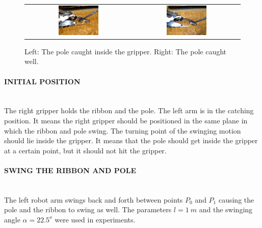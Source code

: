             \begin{figure}
                \centering
                \begin{tabular}{cc}
                \includegraphics[width=0.39\textwidth]{CaughtInsideAdj.png}
                &
                \includegraphics[width=0.39\textwidth]{CaughtWellAdj.png}
                \end{tabular}
                \caption{Left: The pole caught inside the gripper. Right: The pole caught well.}
                \label{fig:PoleCatching}
            \end{figure}

            \paragraph{INITIAL POSITION}~\\
                \noindent The right gripper holds the ribbon and the pole. The left arm is in the catching position. It means the right gripper should be positioned in the same plane in which the ribbon and pole swing. The turning point of the swinging motion should lie inside the gripper. It means that the pole should get inside the gripper at a certain point, but it should not hit the gripper.


            \paragraph{SWING THE RIBBON AND POLE}~\\
                \noindent The left robot arm swings back and forth between points $P_0$ and $P_1$ causing the pole and the ribbon to swing as well. The parameters $l = \SI{1}{m}$ and the swinging angle $\alpha = 22.5^o$ were used in experiments.

